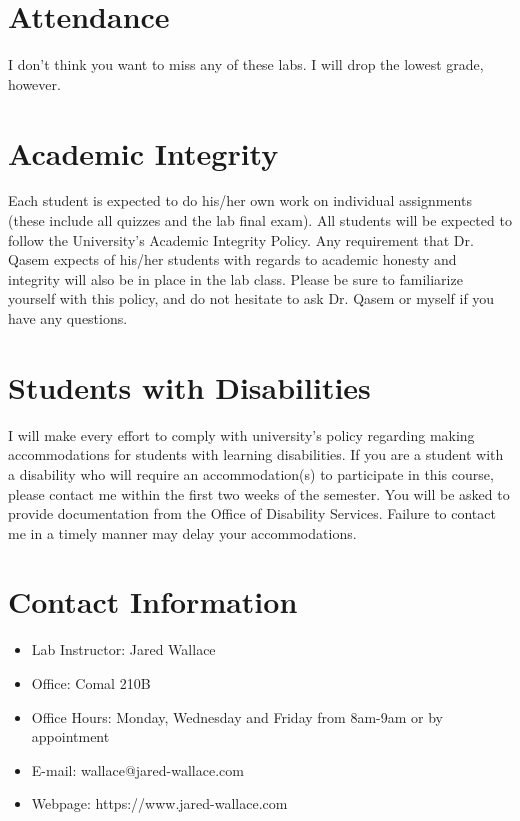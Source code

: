 \documentclass[letterpaper,12pt]{article}
\begin{document}
\section*{Attendance}
I don't think you want to miss any of these labs. I will drop the lowest
grade, however.

\section*{Academic Integrity}
Each student is expected to do his/her own work on individual assignments
(these include all quizzes and the lab final exam). All students will be expected to
follow the University's Academic Integrity Policy. Any requirement that Dr. Qasem
expects of his/her students with regards to academic honesty and
integrity will also be in place in the lab class. Please be sure to familiarize yourself
with this policy, and do not hesitate to ask Dr. Qasem or myself if you
have any questions.

\section*{Students with Disabilities}
I will make every effort to comply with university's policy regarding making
accommodations for students with learning disabilities. If you are a student with a
disability who will require an accommodation(s) to participate in this course, please
contact me within the first two weeks of the semester. You will be asked to provide
documentation from the Office of Disability Services. Failure to contact me in a
timely manner may delay your accommodations.

\section*{Contact Information}
\begin{itemize}
    \item Lab Instructor: Jared Wallace
    \item Office: Comal 210B
    \item Office Hours: Monday, Wednesday and Friday from 8am-9am or by appointment
    \item E-mail: wallace@jared-wallace.com
    \item Webpage: https://www.jared-wallace.com
\end{itemize}
\end{document}
